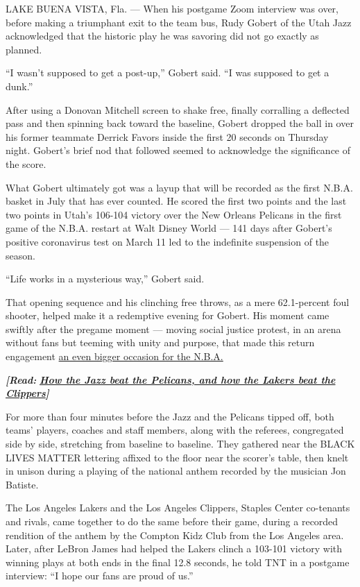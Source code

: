 LAKE BUENA VISTA, Fla. --- When his postgame Zoom interview was over,
before making a triumphant exit to the team bus, Rudy Gobert of the Utah
Jazz acknowledged that the historic play he was savoring did not go
exactly as planned.

``I wasn't supposed to get a post-up,'' Gobert said. ``I was supposed to
get a dunk.''

After using a Donovan Mitchell screen to shake free, finally corralling
a deflected pass and then spinning back toward the baseline, Gobert
dropped the ball in over his former teammate Derrick Favors inside the
first 20 seconds on Thursday night. Gobert's brief nod that followed
seemed to acknowledge the significance of the score.

What Gobert ultimately got was a layup that will be recorded as the
first N.B.A. basket in July that has ever counted. He scored the first
two points and the last two points in Utah's 106-104 victory over the
New Orleans Pelicans in the first game of the N.B.A. restart at Walt
Disney World --- 141 days after Gobert's positive coronavirus test on
March 11 led to the indefinite suspension of the season.

``Life works in a mysterious way,'' Gobert said.

That opening sequence and his clinching free throws, as a mere
62.1-percent foul shooter, helped make it a redemptive evening for
Gobert. His moment came swiftly after the pregame moment --- moving
social justice protest, in an arena without fans but teeming with unity
and purpose, that made this return engagement
\href{https://www.nytimes.com/2020/07/30/sports/basketball/clippers-lakers.html}{an
even bigger occasion for the N.B.A.}

\emph{\textbf{{[}Read:}}
\textbf{\href{https://www.nytimes.com/2020/07/30/sports/basketball/clippers-lakers.html}{\emph{How
the Jazz beat the Pelicans, and how the Lakers beat the
Clippers}}\emph{{]}}}

For more than four minutes before the Jazz and the Pelicans tipped off,
both teams' players, coaches and staff members, along with the referees,
congregated side by side, stretching from baseline to baseline. They
gathered near the BLACK LIVES MATTER lettering affixed to the floor near
the scorer's table, then knelt in unison during a playing of the
national anthem recorded by the musician Jon Batiste.

The Los Angeles Lakers and the Los Angeles Clippers, Staples Center
co-tenants and rivals, came together to do the same before their game,
during a recorded rendition of the anthem by the Compton Kidz Club from
the Los Angeles area. Later, after LeBron James had helped the Lakers
clinch a 103-101 victory with winning plays at both ends in the final
12.8 seconds, he told TNT in a postgame interview: ``I hope our fans are
proud of us.''

